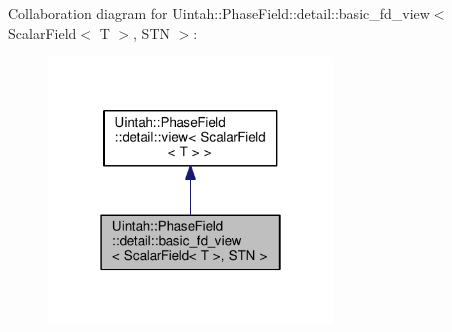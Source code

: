 Collaboration diagram for Uintah\+:\+:Phase\+Field\+:\+:detail\+:\+:basic\+\_\+fd\+\_\+view$<$ Scalar\+Field$<$ T $>$, S\+TN $>$\+:\nopagebreak
\begin{figure}[H]
\begin{center}
\leavevmode
\includegraphics[width=214pt]{classUintah_1_1PhaseField_1_1detail_1_1basic__fd__view_3_01ScalarField_3_01T_01_4_00_01STN_01_4__coll__graph}
\end{center}
\end{figure}
